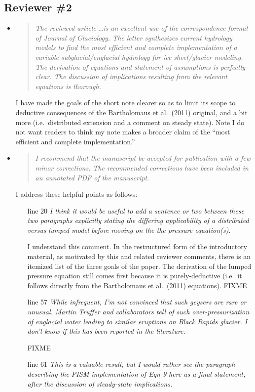 \documentclass[11pt,reqno]{amsart}
\newcommand{\reply}[2]{
\medskip\medskip
\item  \begin{quote}
\emph{#1}
\end{quote}

\medskip
\noindent #2}
\begin{document}
\subsection*{Reviewer \#2}  \begin{itemize}
\reply{The reviewed article \dots is an excellent use of the correspondence format of Journal of Glaciology.  The letter synthesizes current hydrology models to find the most efficient and complete implementation of a variable subglacial/englacial hydrology for ice sheet/glacier modeling.  The derivation of equations and statement of assumptions is perfectly clear.  The discussion of implications resulting from the relevant equations is thorough.}
{I have made the goals of the short note clearer so as to limit its scope to deductive consequences of the Bartholomaus et al.~(2011) original, and a bit more (i.e.~distributed extension and a comment on steady state).  Note I do not want readers to think my note makes a broader claim of the ``most efficient and complete implementation.''}

\reply{I recommend that the manuscript be accepted for publication with a few minor corrections. The recommended corrections have been included in an annotated PDF of the manuscript.}
{I address these helpful points as follows:

\medskip
\begin{itemize}
\item[line 20] \emph{I think it would be useful to add a sentence or two between these two paragraphs explicitly stating the differing applicability of a distributed versus lumped model before moving on the the pressure equation(s).}

I understand this comment.  In the restructured form of the introductory material, as motivated by this and related reviewer comments, there is an itemized list of the three goals of the paper.  The derivation of the lumped pressure equation still comes first because it is purely-deductive (i.e.~it follows directly from the Bartholomaus et al.~(2011) equations).  FIXME

\item[line 57]  \emph{While infrequent, I’m not convinced that such geysers are rare or unusual.  Martin Truffer and collaborators tell of such over-pressurization of  englacial water leading to similar eruptions on Black Rapids glacier.   I don’t know if this has been reported in the literature.}

FIXME

\item[line 61]  \emph{This is a valuable result, but I would rather see the paragraph describing the PISM implementation of Eqn 9 here as a final statement, after the discussion of steady-state implications.}


\end{itemize}}
\end{itemize}
\end{document}
